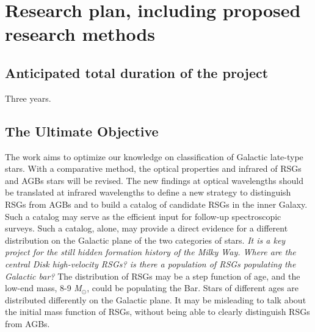 \documentclass[final,11pt,onecolumn,a4paper,twoside]{scrbook_gj}
\newcommand{\Msun}{$\mathcal{M}_\odot$}
\def\Msun{\hbox{\it M$_\odot$}}
\def\Msun{\hbox{\it M$_\odot$}}
\begin{document}
\section{  Research plan, including proposed research methods}
\subsection{ Anticipated total duration of the project}
Three years.

\subsection{The Ultimate Objective}
The work aims to optimize our knowledge on 
classification of Galactic late-type stars.
 With a comparative method, 
the optical properties and infrared 
of RSGs and AGBs stars
will be revised. 
The  new findings at optical wavelengths  should be translated
at infrared wavelengths to define a new strategy 
to distinguish RSGs from  AGBs
and to build a catalog of candidate RSGs in the inner Galaxy.
Such a catalog may serve as  the efficient input for 
follow-up spectroscopic surveys.
Such a catalog, alone, may provide a direct evidence for a
different distribution on the Galactic plane
of the two categories of stars.
{\it It is a key project for the still hidden formation history
of the Milky Way. Where are the central Disk 
high-velocity RSGs? is there
a population of RSGs populating the Galactic bar?}
The distribution of RSGs may be a step function of age,
and the low-end mass, 8-9 \Msun, could be populating the Bar.
Stars of different ages are distributed differently on the
Galactic plane.
It may be misleading to talk about the initial 
mass function of RSGs, without being able to clearly 
distinguish RSGs from AGBs. 

\end{document}
